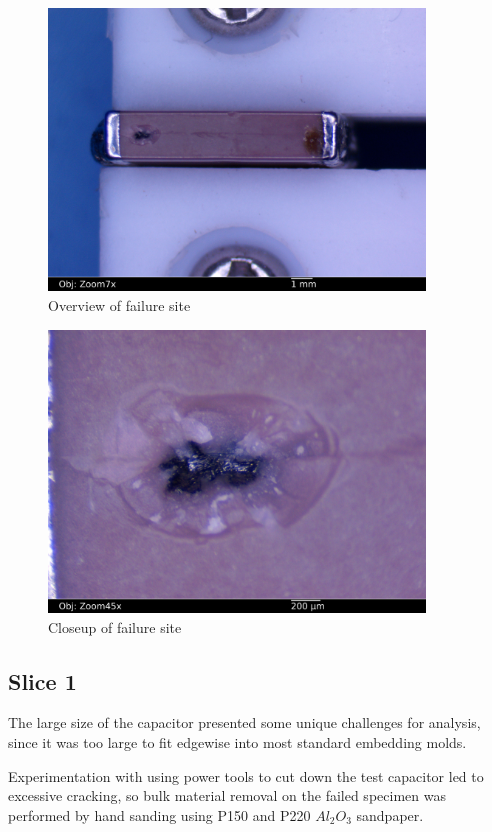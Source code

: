 \documentclass{article}
\begin{document}
\begin{figure}[h]
\includegraphics[width=10cm,keepaspectratio]{02-badcap-side_annotated.jpg}
\caption{Overview of failure site}
\label{fail-overview}
\end{figure}

\begin{figure}[h]
\includegraphics[width=10cm,keepaspectratio]{03-badcap-side_annotated.jpg}
\caption{Closeup of failure site}
\label{fail-closeup}
\end{figure}

\FloatBarrier
\pagebreak

\subsection{Slice 1}

The large size of the capacitor presented some unique challenges for analysis, since it was too large to fit edgewise
into most standard embedding molds.

Experimentation with using power tools to cut down the test capacitor led to excessive cracking, so bulk material
removal on the failed specimen was performed by hand sanding using P150 and P220 $Al_2O_3$ sandpaper.
\end{document}
